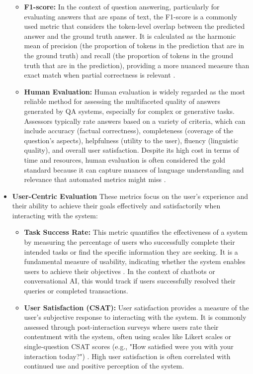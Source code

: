 \documentclass[12pt]{report}
\begin{document}
\begin{itemize}
\begin{itemize}
        \item \textbf{F1-score:} In the context of question answering, particularly for evaluating answers that are spans of text, the F1-score is a commonly used metric that considers the token-level overlap between the predicted answer and the ground truth answer. It is calculated as the harmonic mean of precision (the proportion of tokens in the prediction that are in the ground truth) and recall (the proportion of tokens in the ground truth that are in the prediction), providing a more nuanced measure than exact match when partial correctness is relevant \cite{Rajpurkar2016}.

        \item \textbf{Human Evaluation:} Human evaluation is widely regarded as the most reliable method for assessing the multifaceted quality of answers generated by QA systems, especially for complex or generative tasks. Assessors typically rate answers based on a variety of criteria, which can include accuracy (factual correctness), completeness (coverage of the question's aspects), helpfulness (utility to the user), fluency (linguistic quality), and overall user satisfaction. Despite its high cost in terms of time and resources, human evaluation is often considered the gold standard because it can capture nuances of language understanding and relevance that automated metrics might miss \cite{Chang2023Survey, Belz2005HumanEval}.
    \end{itemize}

  \item \textbf{User-Centric Evaluation}
  These metrics focus on the user's experience and their ability to achieve their goals effectively and satisfactorily when interacting with the system:

  \begin{itemize}
      \item \textbf{Task Success Rate:} This metric quantifies the effectiveness of a system by measuring the percentage of users who successfully complete their intended tasks or find the specific information they are seeking. It is a fundamental measure of usability, indicating whether the system enables users to achieve their objectives \cite{Sauro2016}. In the context of chatbots or conversational AI, this would track if users successfully resolved their queries or completed transactions.

      \item \textbf{User Satisfaction (CSAT):} User satisfaction provides a measure of the user's subjective response to interacting with the system. It is commonly assessed through post-interaction surveys where users rate their contentment with the system, often using scales like Likert scales or single-question CSAT scores (e.g., "How satisfied were you with your interaction today?") \cite{Sauro2016, Følstad2018}. High user satisfaction is often correlated with continued use and positive perception of the system.


\end{itemize}
\end{itemize}
\end{document}
